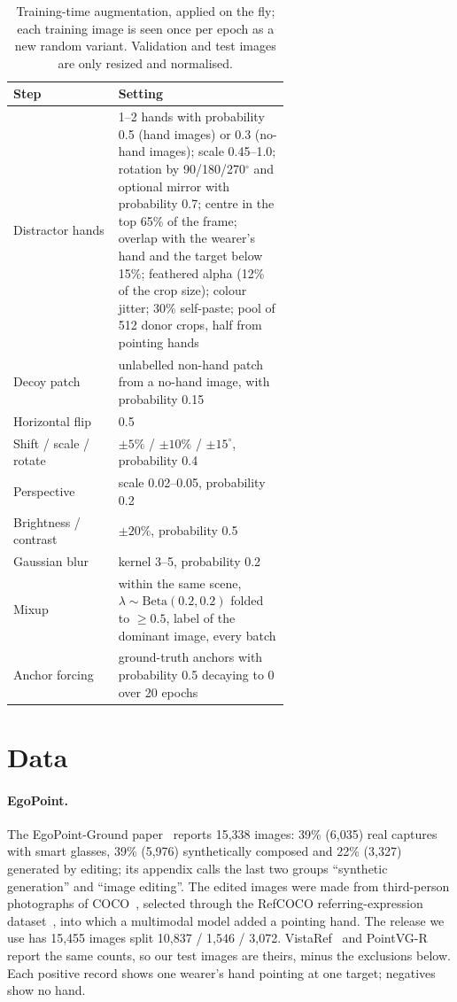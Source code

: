 \begin{table}[h]
  \caption{Training-time augmentation, applied on the fly; each training image is seen once per epoch as a new random variant. Validation and test images are only resized and normalised.}
  \label{tab:aug}
  \footnotesize
  \begin{tabular}{lp{0.62\linewidth}}
    \toprule
    Step & Setting \\
    \midrule
    Distractor hands & 1--2 hands with probability 0.5 (hand images) or 0.3 (no-hand images); scale 0.45--1.0; rotation by 90/180/270$^\circ$ and optional mirror with probability 0.7; centre in the top 65\% of the frame; overlap with the wearer's hand and the target below 15\%; feathered alpha (12\% of the crop size); colour jitter; 30\% self-paste; pool of 512 donor crops, half from pointing hands \\
    Decoy patch & unlabelled non-hand patch from a no-hand image, with probability 0.15 \\
    Horizontal flip & 0.5 \\
    Shift / scale / rotate & ${\pm}5\%$ / ${\pm}10\%$ / ${\pm}15^\circ$, probability 0.4 \\
    Perspective & scale 0.02--0.05, probability 0.2 \\
    Brightness / contrast & ${\pm}20\%$, probability 0.5 \\
    Gaussian blur & kernel 3--5, probability 0.2 \\
    Mixup & within the same scene, $\lambda\sim\mathrm{Beta}(0.2,0.2)$ folded to ${\geq}0.5$, label of the dominant image, every batch \\
    Anchor forcing & ground-truth anchors with probability 0.5 decaying to 0 over 20 epochs \\
    \bottomrule
  \end{tabular}
\end{table}

\section{Data}\label{app:data}

\paragraph{EgoPoint.} The EgoPoint-Ground paper~\cite{egopoint} reports 15,338 images: 39\% (6,035) real captures with smart glasses, 39\% (5,976) synthetically composed and 22\% (3,327) generated by editing; its appendix calls the last two groups ``synthetic generation'' and ``image editing''. The edited images were made from third-person photographs of COCO~\cite{lin2014coco}, selected through the RefCOCO referring-expression dataset~\cite{yu2016modeling}, into which a multimodal model added a pointing hand. The release we use has 15,455 images split 10,837 / 1,546 / 3,072. VistaRef~\cite{li2026vistaref} and PointVG-R~\cite{li2026pointvgr} report the same counts, so our test images are theirs, minus the exclusions below. Each positive record shows one wearer's hand pointing at one target; negatives show no hand.


